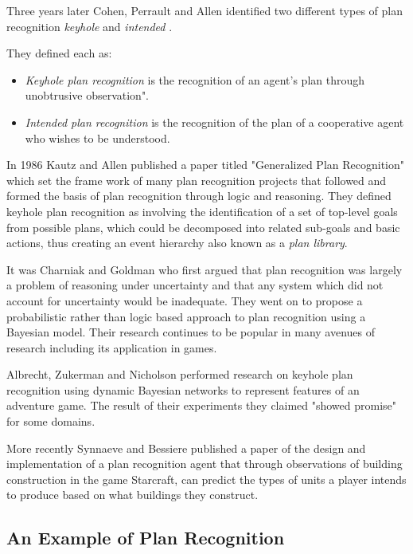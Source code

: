 \documentclass[parskip]{cs4rep}
\begin{document}
Three years later Cohen, Perrault and Allen identified two different types of plan recognition \textit{keyhole} and \textit{intended} \cite{Cohen82a}. 

They defined each as:

\begin{itemize}
\item
\textit{Keyhole plan recognition} is the recognition of an agent's plan through unobtrusive observation".
\item
\textit{Intended plan recognition} is the recognition of the plan of a cooperative agent who wishes to be understood.
\newline
\end{itemize}

In 1986 Kautz and Allen published a paper titled "Generalized Plan Recognition" \cite{conf/aaai/KautzA86} which set the frame work of many plan recognition projects that followed and formed the basis of plan recognition through logic and reasoning. They defined keyhole plan recognition as involving the identification of a set of top-level goals from possible plans, which could be decomposed into related sub-goals and basic actions, thus creating an event hierarchy also known as a \textit{plan library}. 

It was Charniak and Goldman \cite{journals/ai/CharniakG93} who first argued that plan recognition was largely a problem of reasoning under uncertainty and that any system which did not account for uncertainty would be inadequate. They went on to propose a probabilistic rather than logic based approach to  plan recognition using a Bayesian model. Their research continues to be popular in many avenues of research including its application in games.

Albrecht, Zukerman and Nicholson \cite{Albrecht98bayesianmodels} performed research on keyhole plan recognition using dynamic Bayesian networks to represent features of an adventure game. The result of their experiments they claimed "showed promise" for some domains. 

More recently Synnaeve and Bessiere \cite{conf/aiide/SynnaeveB11} published a paper of the design and implementation of a plan recognition agent that through observations of building construction in the game Starcraft, can predict the types of units a player intends to produce based on what buildings they construct.

\subsection{An Example of Plan Recognition}
\end{document}
